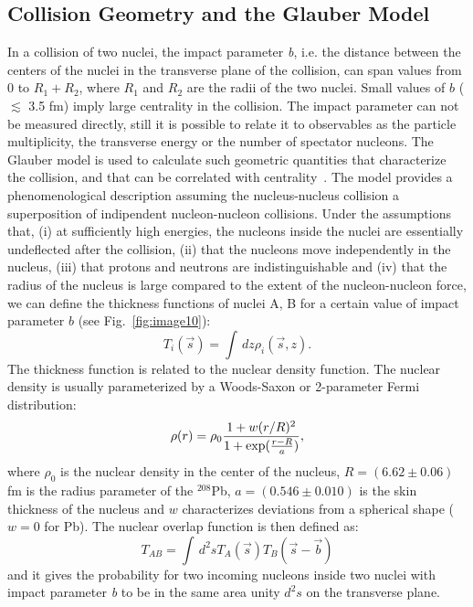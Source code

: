 \subsection{Collision Geometry and the Glauber Model}
In a collision of two nuclei, the impact parameter \textit{b}, i.e. the distance between the centers of the nuclei in the transverse plane of the collision, can span values from 0 to $R_1+R_2$, where  $R_1$ and  $R_2$ are the radii of the two nuclei. Small values of $b$ ($\lesssim$ 3.5 fm) imply large centrality in the collision. The impact parameter can not be measured directly, still it is possible to relate it to observables as the particle multiplicity, the transverse energy or the number of spectator nucleons. 
The Glauber model is used to calculate such geometric quantities that characterize the collision, and that can be correlated with centrality~\cite{Miller:2007ri}.
The model provides a phenomenological description assuming the nucleus-nucleus collision a superposition of indipendent nucleon-nucleon collisions.
Under the assumptions that, (i) at sufficiently high energies, the nucleons inside the nuclei are essentially undeflected after the collision, (ii) that the nucleons move independently in the nucleus, (iii) that protons and neutrons are indistinguishable and (iv) that the radius of the nucleus is large compared to the extent of the nucleon-nucleon force, we can define the thickness functions of nuclei A, B for a certain value of impact parameter $b$ (see Fig.~\ref{fig:image10}):
\begin{equation}
T_i(\vec s) = \int\,dz \rho_i(\vec s,z).
\end{equation}
The thickness function is related to the nuclear density function. The nuclear density is usually parameterized by a Woods-Saxon or 2-parameter Fermi distribution:
\begin{equation}
\rho (r) = \rho_0 \frac{1+w(r/R)^2}{1+{\rm exp}(\frac{r-R}{a})},
\end{equation}
where $\rho_0$ is the nuclear density in the center of the nucleus, $R = (6.62 \pm 0.06)$ fm is the radius parameter of the ${}^{208}$Pb, $a = (0.546 \pm 0.010)$ is the skin thickness of the nucleus and $w$ characterizes deviations from a spherical shape ($w=0$ for Pb). The nuclear overlap function is then defined as:
\begin{equation}
T_{AB} = \int \,d^2s T_A(\vec s)T_B(\vec s - \vec b)
\end{equation}
and it gives the probability for two incoming nucleons inside two nuclei with impact parameter \textit{b} to be in the same area unity $d^2s$ on the transverse plane.
